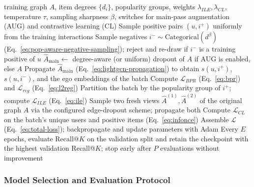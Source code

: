 \begin{algorithm}[t]
\caption{One training epoch of Popularity-Aware LightGCN}
\label{alg:training}
\begin{algorithmic}[1]
\REQUIRE training graph $A$, item degrees $\{d_i\}$, popularity groups, weights
$\lambda_{ILE}, \lambda_{CL}$, temperature $\tau$, sampling sharpness $\beta$, switches for
main-pass augmentation (AUG) and contrastive learning (CL)
    \STATE Sample positive pairs $(u,i^+)$ uniformly from the training interactions
    \STATE Sample negatives $i^- \sim \mathrm{Categorical}(d^{\beta})$
    (Eq.~\eqref{eq:pop-aware-negative-sampling}); reject and re-draw if $i^-$ is a training
    positive of $u$
    \STATE $\hat{A}_{\mathrm{main}} \leftarrow$ degree-aware (or uniform) dropout of $A$ if
    AUG is enabled, else $A$
    \STATE Propagate $\hat{A}_{\mathrm{main}}$ (Eq.~\eqref{eq:lightgcn-propagation}) to obtain
    $s(u,i^+)$, $s(u,i^-)$, and the ego embeddings of the batch
    \STATE Compute $\mathcal{L}_{BPR}$ (Eq.~\eqref{eq:bpr}) and $\mathcal{L}_{reg}$ (Eq.~\eqref{eq:l2reg})
        \STATE Partition the batch by the popularity group of $i^+$; compute
        $\mathcal{L}_{ILE}$ (Eq.~\eqref{eq:ile})
    \ENDIF
        \STATE Sample two fresh views $\hat{A}^{(1)}, \hat{A}^{(2)}$ of the original graph $A$
        via the configured edge-dropout scheme; propagate both
        \STATE Compute $\mathcal{L}_{CL}$ on the batch's unique users and positive items
        (Eq.~\eqref{eq:infonce})
    \ENDIF
    \STATE Assemble $\mathcal{L}$ (Eq.~\eqref{eq:total-loss}); backpropagate and update
    parameters with Adam
\ENDFOR
\STATE Every $E$ epochs, evaluate Recall@$K$ on the validation split and retain the checkpoint
with the highest validation Recall@$K$; stop early after $P$ evaluations without improvement
\end{algorithmic}
\end{algorithm}

\subsubsection{Model Selection and Evaluation Protocol}
\label{sec:model_selection_protocol}

